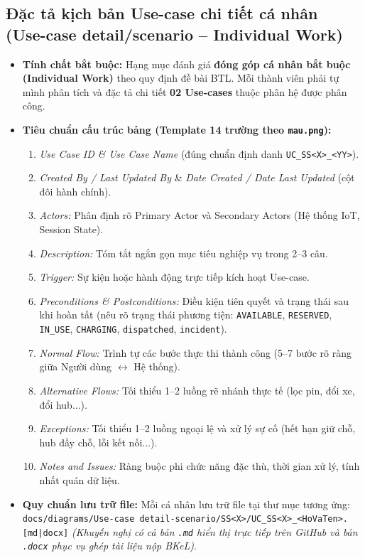 \documentclass[11pt,a4paper]{article}
\begin{document}
\subsection{Đặc tả kịch bản Use-case chi tiết cá nhân (Use-case detail/scenario -- Individual Work)}

\begin{itemize}[leftmargin=2em, itemsep=2pt]
  \item \textbf{Tính chất bắt buộc:} Hạng mục đánh giá \textbf{đóng góp cá nhân bắt buộc (Individual Work)} theo quy định đề bài BTL. Mỗi thành viên phải tự mình phân tích và đặc tả chi tiết \textbf{02 Use-cases} thuộc phân hệ được phân công.
  \item \textbf{Tiêu chuẩn cấu trúc bảng (Template 14 trường theo \texttt{mau.png}):}
    \begin{enumerate}[label=\alph*., leftmargin=1.5em, itemsep=0pt, parsep=0pt]
      \item \textit{Use Case ID \& Use Case Name} (đúng chuẩn định danh \texttt{UC\_SS<X>\_<YY>}).
      \item \textit{Created By / Last Updated By} \& \textit{Date Created / Date Last Updated} (cột đôi hành chính).
      \item \textit{Actors:} Phân định rõ Primary Actor và Secondary Actors (Hệ thống IoT, Session State).
      \item \textit{Description:} Tóm tắt ngắn gọn mục tiêu nghiệp vụ trong 2--3 câu.
      \item \textit{Trigger:} Sự kiện hoặc hành động trực tiếp kích hoạt Use-case.
      \item \textit{Preconditions \& Postconditions:} Điều kiện tiên quyết và trạng thái sau khi hoàn tất (nêu rõ trạng thái phương tiện: \texttt{AVAILABLE}, \texttt{RESERVED}, \texttt{IN\_USE}, \texttt{CHARGING}, \texttt{dispatched}, \texttt{incident}).
      \item \textit{Normal Flow:} Trình tự các bước thực thi thành công (5--7 bước rõ ràng giữa Người dùng $\leftrightarrow$ Hệ thống).
      \item \textit{Alternative Flows:} Tối thiểu 1--2 luồng rẽ nhánh thực tế (lọc pin, đổi xe, đổi hub...).
      \item \textit{Exceptions:} Tối thiểu 1--2 luồng ngoại lệ và xử lý sự cố (hết hạn giữ chỗ, hub đầy chỗ, lỗi kết nối...).
      \item \textit{Notes and Issues:} Ràng buộc phi chức năng đặc thù, thời gian xử lý, tính nhất quán dữ liệu.
    \end{enumerate}
  \item \textbf{Quy chuẩn lưu trữ file:} Mỗi cá nhân lưu trữ file tại thư mục tương ứng:\newline
  \texttt{docs/diagrams/Use-case detail-scenario/SS<X>/UC\_SS<X>\_<HoVaTen>.[md|docx]} \newline
  \textit{(Khuyến nghị có cả bản \texttt{.md} hiển thị trực tiếp trên GitHub và bản \texttt{.docx} phục vụ ghép tài liệu nộp BKeL)}.
\end{itemize}
\end{document}
